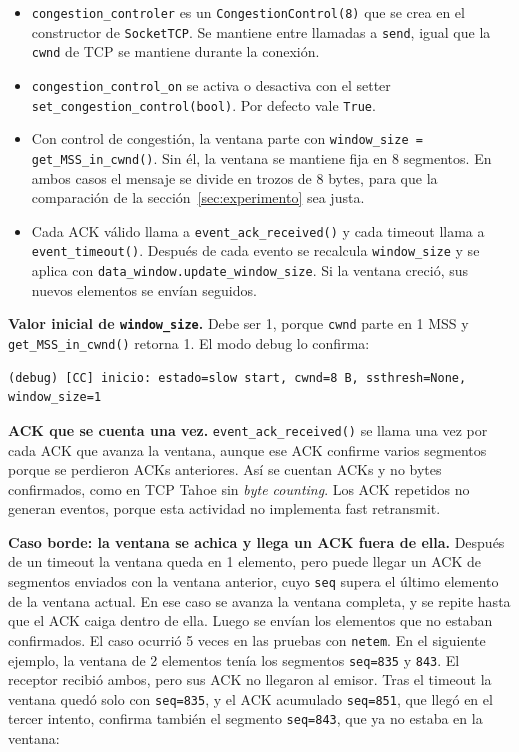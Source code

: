 \documentclass[11pt,letterpaper]{article}
\begin{document}
\begin{itemize}[nosep]
  \item \texttt{congestion\_controler} es un \texttt{CongestionControl(8)} que se crea en
        el constructor de \texttt{SocketTCP}. Se mantiene entre llamadas a
        \texttt{send}, igual que la \texttt{cwnd} de TCP se mantiene durante la conexión.
  \item \texttt{congestion\_control\_on} se activa o desactiva con el setter
        \texttt{set\_congestion\_control(bool)}. Por defecto vale \texttt{True}.
  \item Con control de congestión, la ventana parte con
        \texttt{window\_size = get\_MSS\_in\_cwnd()}. Sin él, la ventana se mantiene fija
        en 8 segmentos. En ambos casos el mensaje se divide en trozos de 8 bytes, para que
        la comparación de la sección~\ref{sec:experimento} sea justa.
  \item Cada ACK válido llama a \texttt{event\_ack\_received()} y cada timeout llama a
        \texttt{event\_timeout()}. Después de cada evento se recalcula
        \texttt{window\_size} y se aplica con \texttt{data\_window.update\_window\_size}.
        Si la ventana creció, sus nuevos elementos se envían seguidos.
\end{itemize}

\textbf{Valor inicial de \texttt{window\_size}.} Debe ser 1, porque \texttt{cwnd} parte en
1 MSS y \texttt{get\_MSS\_in\_cwnd()} retorna 1. El modo debug lo confirma:

\begin{lstlisting}
(debug) [CC] inicio: estado=slow start, cwnd=8 B, ssthresh=None, window_size=1
\end{lstlisting}

\textbf{ACK que se cuenta una vez.} \texttt{event\_ack\_received()} se llama una vez por
cada ACK que avanza la ventana, aunque ese ACK confirme varios segmentos porque se
perdieron ACKs anteriores. Así se cuentan ACKs y no bytes confirmados, como en TCP Tahoe
sin \emph{byte counting}. Los ACK repetidos no generan eventos, porque esta actividad no
implementa fast retransmit.

\textbf{Caso borde: la ventana se achica y llega un ACK fuera de ella.} Después de un
timeout la ventana queda en 1 elemento, pero puede llegar un ACK de segmentos enviados con
la ventana anterior, cuyo \texttt{seq} supera el último elemento de la ventana actual. En
ese caso se avanza la ventana completa, y se repite hasta que el ACK caiga dentro de ella.
Luego se envían los elementos que no estaban confirmados. El caso ocurrió 5 veces en las
pruebas con \texttt{netem}. En el siguiente ejemplo, la ventana de 2 elementos tenía los
segmentos \texttt{seq=835} y \texttt{843}. El receptor recibió ambos, pero sus ACK no
llegaron al emisor. Tras el timeout la ventana quedó solo con \texttt{seq=835}, y el ACK
acumulado \texttt{seq=851}, que llegó en el tercer intento, confirma también el segmento
\texttt{seq=843}, que ya no estaba en la ventana:
\end{document}

